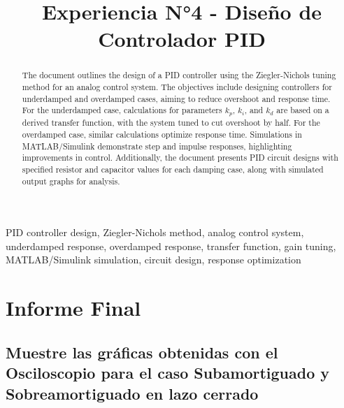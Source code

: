 \documentclass[conference]{IEEEtran}
\begin{document}
	
	\title{Experiencia N°4 - Diseño de Controlador PID}
	
	\author{
		\and
		\and
	}
	
	\maketitle
	\begin{abstract}
		The document outlines the design of a PID controller using the Ziegler-Nichols tuning method for an analog control system. The objectives include designing controllers for underdamped and overdamped cases, aiming to reduce overshoot and response time. For the underdamped case, calculations for parameters \( k_p \), \( k_i \), and \( k_d \) are based on a derived transfer function, with the system tuned to cut overshoot by half. For the overdamped case, similar calculations optimize response time. Simulations in MATLAB/Simulink demonstrate step and impulse responses, highlighting improvements in control. Additionally, the document presents PID circuit designs with specified resistor and capacitor values for each damping case, along with simulated output graphs for analysis.
	\end{abstract}
	
	\begin{IEEEkeywords}
		PID controller design, Ziegler-Nichols method, analog control system, underdamped response, overdamped response, transfer function, gain tuning, MATLAB/Simulink simulation, circuit design, response optimization
	\end{IEEEkeywords}
	\section{\textbf{Informe Final}}
	\subsection{\textbf{Muestre las gráficas obtenidas con el Osciloscopio para el caso Subamortiguado y Sobreamortiguado en lazo cerrado}}
	
\end{document}
